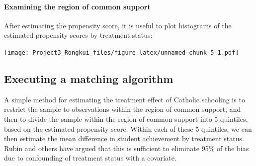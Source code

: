 \documentclass[]{article}
\newenvironment{Shaded}{\begin{snugshade}}{\end{snugshade}}
\newcommand{\DataTypeTok}[1]{\textcolor[rgb]{0.13,0.29,0.53}{#1}}
\newcommand{\DecValTok}[1]{\textcolor[rgb]{0.00,0.00,0.81}{#1}}
\newcommand{\KeywordTok}[1]{\textcolor[rgb]{0.13,0.29,0.53}{\textbf{#1}}}
\newcommand{\NormalTok}[1]{#1}
\newcommand{\OperatorTok}[1]{\textcolor[rgb]{0.81,0.36,0.00}{\textbf{#1}}}
\newcommand{\StringTok}[1]{\textcolor[rgb]{0.31,0.60,0.02}{#1}}
\let\oldparagraph\paragraph
\renewcommand{\paragraph}[1]{\oldparagraph{#1}\mbox{}}
\begin{document}
\hypertarget{examining-the-region-of-common-support}{%
\paragraph{Examining the region of common support}\label{examining-the-region-of-common-support}}

After estimating the propensity score, it is useful to plot histograms of the estimated propensity scores by treatment status:

\begin{Shaded}
\end{Shaded}

\texttt{[image: Project3\_Rongkui\_files/figure-latex/unnamed-chunk-5-1.pdf]}

\hypertarget{executing-a-matching-algorithm}{%
\subsection{Executing a matching algorithm}\label{executing-a-matching-algorithm}}

A simple method for estimating the treatment effect of Catholic schooling is to restrict the sample to observations within the region of common support, and then to divide the sample within the region of common support into 5 quintiles, based on the estimated propensity score. Within each of these 5 quintiles, we can then estimate the mean difference in student achievement by treatment status. Rubin and others have argued that this is sufficient to eliminate 95\% of the bias due to confounding of treatment status with a covariate.
\end{document}
